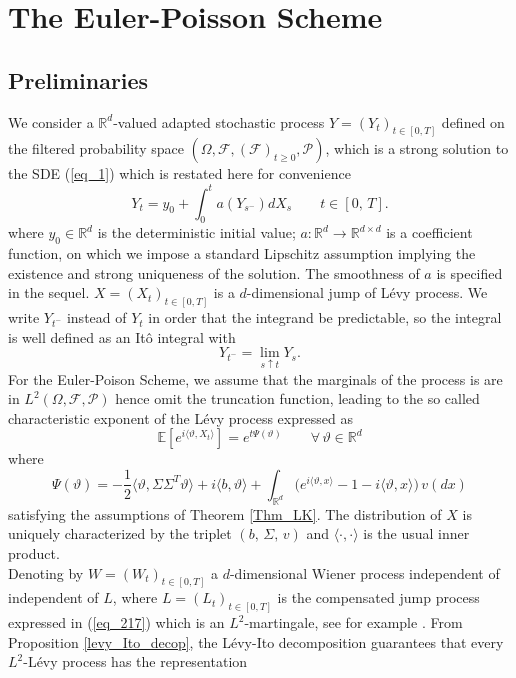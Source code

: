 \chapter{The Euler-Poisson Scheme}
\section{Preliminaries}
We consider a $\mathbb{R}^d$-valued adapted stochastic process $Y= (Y_t)_{t \in [0, T]}$ defined on the filtered probability space $(\Omega , \mathcal{F}, (\mathcal{F})_{t \geq 0}, \mathcal{P})$, which is a strong solution to the SDE (\ref{eq_1}) which is restated here for convenience 
\begin{equation}\label{eq_major}
      Y_t = y_0  + \int_0^t a(Y_{s^-})dX_s \qquad t \in [0, \, T].
\end{equation}
where $y_0  \in \mathbb{R}^d$ is the deterministic initial value; $a : \mathbb{R}^d \to \mathbb{R}^{d \times d}
$ is a coefficient function, on which we impose a standard Lipschitz assumption implying the  existence and strong uniqueness of the solution. The smoothness of $a$  is specified in the sequel.  $X=(X
_t)_{t\in [0,T]}
 $ is a $d$-dimensional jump of L\'evy process. We write ${Y}_{t^-}$ instead of ${Y}_{t}$ in order that the integrand be predictable,
so the integral is well defined as an It\^o integral with $${Y}_{t^-} = \lim_{s \uparrow t}Y_s.$$
For the Euler-Poison Scheme, we assume that the marginals of the process is are in $L^2 (\Omega , \mathcal{F}, \mathcal{P})$ hence omit the truncation function, leading to the  so called characteristic exponent of the L\'evy process expressed as 
\begin{equation*}
    \mathbb{E}[e^{i\langle \vartheta, X_t\rangle}] = e^{t\Psi(\vartheta)} \qquad \forall \, \vartheta \in \mathbb{R}^d
\end{equation*}
where
\begin{equation}\label{inf_div_dist_levy}
    \Psi(\vartheta) = -\frac{1}{2}\langle \vartheta, \Sigma \Sigma^T \vartheta \rangle + i\langle b, \vartheta \rangle + \int_{\mathbb{R}^d} \big( e^{i\langle \vartheta,x \rangle } - 1 - {i\langle \vartheta,x \rangle }\big) \, v(dx) 
\end{equation}
satisfying the assumptions of Theorem \ref{Thm_LK}. The distribution of $X$ is uniquely characterized by the triplet $(b, \, \Sigma,\, v)$ and $\langle \cdot, \cdot
\rangle$ is the usual inner product. \\
Denoting by $W=(W_t)_{t\in [0,T]} $ a $d$-dimensional Wiener process independent of independent of $L$, where $L=(L_t)_{t\in [0,T]}$ is the compensated jump process expressed in (\ref{eq_217}) which is an $L^2$-martingale, see for example \cite{applebaum2009levy}. From Proposition \ref{levy_Ito_decop}, the L\'evy-Ito decomposition guarantees that every  $L^2$-L\'evy process has the representation 
